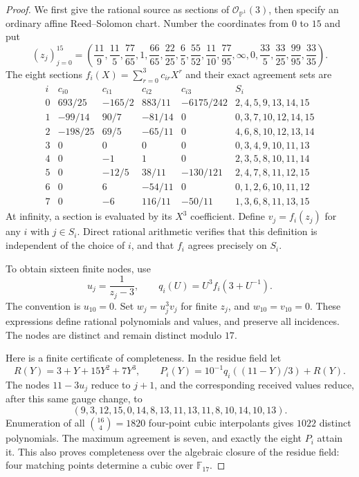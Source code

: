 \begin{proof}
We first give the rational source as sections of $\mathcal O_{\mathbb P^1}(3)$, then specify an ordinary affine Reed--Solomon chart. Number the coordinates from $0$ to $15$ and put
\[
 (z_j)_{j=0}^{15}=\left(
 \frac{11}{9},\frac{11}{5},\frac{77}{65},1,
 \frac{66}{65},\frac{22}{25},\frac65,\frac{55}{52},
 \frac{11}{10},\frac{77}{95},\infty,0,
 \frac{33}{5},\frac{33}{25},\frac{99}{95},\frac{33}{35}\right).
\]
The eight sections $f_i(X)=\sum_{r=0}^3 c_{ir}X^r$ and their exact agreement sets are
\[
\begin{array}{c|rrrr|l}
 i&c_{i0}&c_{i1}&c_{i2}&c_{i3}& S_i\\\hline
0&693/25&-165/2&883/11&-6175/242&2,4,5,9,13,14,15\\
1&-99/14&90/7&-81/14&0&0,3,7,10,12,14,15\\
2&-198/25&69/5&-65/11&0&4,6,8,10,12,13,14\\
3&0&0&0&0&0,3,4,9,10,11,13\\
4&0&-1&1&0&2,3,5,8,10,11,14\\
5&0&-12/5&38/11&-130/121&2,4,7,8,11,12,15\\
6&0&6&-54/11&0&0,1,2,6,10,11,12\\
7&0&-6&116/11&-50/11&1,3,6,8,11,13,15
\end{array}
\]
At infinity, a section is evaluated by its $X^3$ coefficient. Define $v_j=f_i(z_j)$ for any $i$ with $j\in S_i$. Direct rational arithmetic verifies that this definition is independent of the choice of $i$, and that $f_i$ agrees precisely on $S_i$.

To obtain sixteen finite nodes, use
\[
 u_j=\frac1{z_j-3},\qquad
 q_i(U)=U^3 f_i(3+U^{-1}).
\]
The convention is $u_{10}=0$. Set $w_j=u_j^3v_j$ for finite $z_j$, and $w_{10}=v_{10}=0$. These expressions define rational polynomials and values, and preserve all incidences. The nodes are distinct and remain distinct modulo $17$.

Here is a finite certificate of completeness. In the residue field let
\[
 R(Y)=3+Y+15Y^2+7Y^3,\qquad
 P_i(Y)=10^{-1}q_i((11-Y)/3)+R(Y).
\]
The nodes $11-3u_j$ reduce to $j+1$, and the corresponding received values reduce, after this same gauge change, to
\[
 (9,3,12,15,0,14,8,13,11,13,11,8,10,14,10,13).
\]
Enumeration of all $\binom{16}{4}=1820$ four-point cubic interpolants gives $1022$ distinct polynomials. The maximum agreement is seven, and exactly the eight $P_i$ attain it. This also proves completeness over the algebraic closure of the residue field: four matching points determine a cubic over $\mathbb F_{17}$.


\end{proof}
